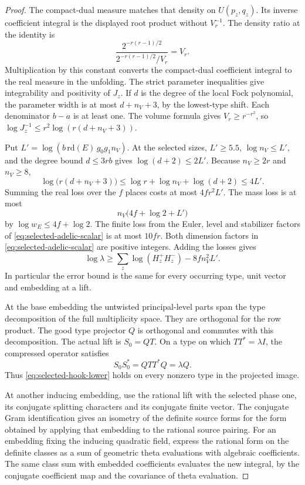 \begin{proof}
The compact-dual measure
matches that density on \(U(p_z,q_z)\). Its inverse
coefficient integral is the displayed root product
without \(V_r^{-1}\). The density ratio at the identity is
\[
 \frac{2^{-r(r-1)/2}}{2^{-r(r-1)/2}/V_r}=V_r .
\]
Multiplication by this constant converts the compact-dual
coefficient integral to the real measure in the unfolding. The
strict parameter inequalities give integrability and
positivity of \(J_z\). If \(d\) is the degree of the
local Fock polynomial, the parameter width is at
most \(d+n_V+3\), by the lowest-type shift. Each
denominator \(b-a\) is at least one. The volume
formula gives \(V_r\ge r^{-r^2}\), so
\(\log J_z^{-1}\le r^2\log(r(d+n_V+3))\).
\cite{harish-chandra-degree}\label{cor:selected-lift-scalar-5}

Put \(L'=\log(b\,\mathrm{rd}(E)\,g_0g_1 n_V)\).
At the selected sizes,
\(L'\ge5.5\), \(\log n_V\le L'\), and the degree
bound \(d\le3rb\) gives \(\log(d+2)\le2L'\).
Because \(n_V\ge2r\) and \(n_V\ge8\),
\[
 \log\big(r(d+n_V+3)\big)\le\log r+\log n_V+\log(d+2)
    \le4L' .
\]
Summing the real loss over the \(f\) places costs at most
\(4fr^2L'\). The mass loss is at most
\[
 n_V\bigl(4f+\log 2+L'\bigr)
\]
by \(\log w_E\le4f+\log 2\).
The finite loss from the Euler, level and stabilizer factors
of \eqref{eq:selected-adelic-scalar} is at most \(10fr\).
Both dimension factors in \eqref{eq:selected-adelic-scalar}
are positive integers. Adding the losses gives
\begin{equation}\label{eq:selected-hook-lower}
       \log\lambda\ge
        \sum_z\log(H_z^+ H_z^-)-8 f n_V^2 L'.
\end{equation}
In particular the error bound is the same for every
occurring type, unit vector and embedding at a lift.


At the base embedding the untwisted principal-level
parts span the type decomposition of the full multiplicity
space. They are orthogonal for the row product. The good
type projector \(Q\) is orthogonal and commutes with
this decomposition. The actual lift is \(S_0=QT\).
On a type on which \(TT^*=\lambda I\), the compressed operator
satisfies
\[
 S_0S_0^*=QTT^*Q=\lambda Q .
\]
Thus \eqref{eq:selected-hook-lower} holds on every nonzero
type in the projected image.

At another inducing embedding, use the rational lift
with the selected phase one, its conjugate splitting
characters and its conjugate finite vector. The
conjugate Gram identification gives an isometry of the
definite source forms for the form obtained by applying
that embedding to the rational source pairing. For an
embedding fixing the inducing quadratic field, express the rational form on the definite classes as a sum of geometric theta evaluations with algebraic coefficients.
The same class sum with embedded coefficients evaluates
the new integral, by the conjugate coefficient map and
the covariance of theta evaluation.


\end{proof}
